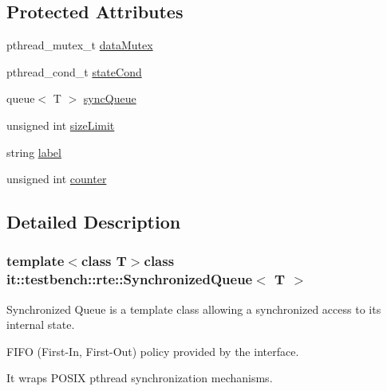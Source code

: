 \subsection*{Protected Attributes}
\begin{DoxyCompactItemize}
\item 
pthread\-\_\-mutex\-\_\-t \hyperlink{classit_1_1testbench_1_1rte_1_1SynchronizedQueue_aba0a875f1b456aec7f7262576fb02773}{data\-Mutex}
\item 
pthread\-\_\-cond\-\_\-t \hyperlink{classit_1_1testbench_1_1rte_1_1SynchronizedQueue_a52beabff3eff970d293a784b8f710c93}{state\-Cond}
\item 
queue$<$ T $>$ \hyperlink{classit_1_1testbench_1_1rte_1_1SynchronizedQueue_a3f760daa0238c1c3a9983bfc75c141ad}{sync\-Queue}
\item 
unsigned int \hyperlink{classit_1_1testbench_1_1rte_1_1SynchronizedQueue_a100815b13dc7f2ca1e75d40f0b036258}{size\-Limit}
\item 
string \hyperlink{classit_1_1testbench_1_1rte_1_1SynchronizedQueue_adef1028de164827d377ae7d9a3783bff}{label}
\item 
unsigned int \hyperlink{classit_1_1testbench_1_1rte_1_1SynchronizedQueue_a430d81d803d75be8adef0fc2440678be}{counter}
\end{DoxyCompactItemize}


\subsection{Detailed Description}
\subsubsection*{template$<$class T$>$class it\-::testbench\-::rte\-::\-Synchronized\-Queue$<$ T $>$}

Synchronized Queue is a template class allowing a synchronized access to its internal state.

F\-I\-F\-O (First-\/\-In, First-\/\-Out) policy provided by the interface.

It wraps P\-O\-S\-I\-X pthread synchronization mechanisms. 

